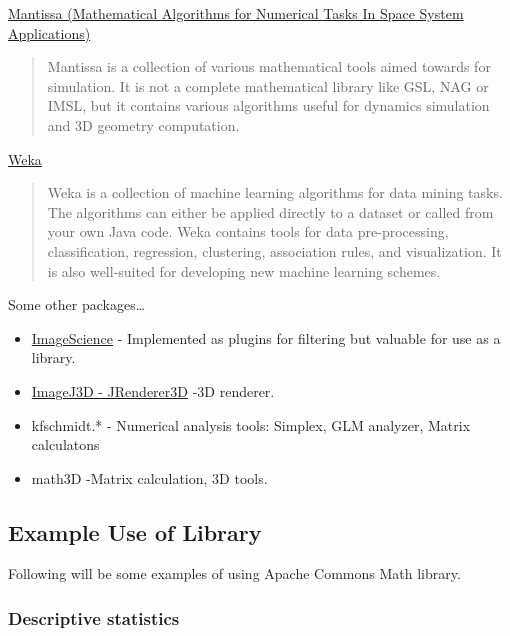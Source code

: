 \documentclass[11pt,a4paper,oneside]{report}
\begin{document}
\href{http://spaceroots.org/software/mantissa/index.html}{Mantissa (Mathematical Algorithms for Numerical Tasks In Space System Applications)}
\begin{shaded}
\begin{quote}
Mantissa is a collection of various mathematical tools aimed towards for simulation. It is not a complete mathematical library like GSL, NAG or IMSL, but it contains various algorithms useful for dynamics simulation and 3D geometry computation.
\end{quote}
\end{shaded}

\href{http://www.cs.waikato.ac.nz/ml/weka/}{Weka}
\begin{shaded}
\begin{quote}
Weka is a collection of machine learning algorithms for data mining tasks. The algorithms can either be applied directly to a dataset or called from your own Java code. Weka contains tools for data pre-processing, classification, regression, clustering, association rules, and visualization. It is also well-suited for developing new machine learning schemes.
\end{quote}
\end{shaded}

Some other packages\dots

\begin{itemize}
\item \href{http://www.imagescience.org/meijering/software/}{ImageScience} - Implemented as plugins for filtering but valuable for use as a library. 
\item \href{http://www.f4.htw-berlin.de/~barthel/ImageJ/ImageJ3D/ImageJ3D.html}{ImageJ3D - JRenderer3D} -3D renderer. 
\item kfschmidt.*  - Numerical analysis tools: Simplex, GLM analyzer, Matrix calculatons
\item math3D -Matrix calculation, 3D tools.  
\end{itemize}

\subsection{Example Use of Library}
Following will be some examples of using Apache Commons Math library. 
\subsubsection{Descriptive statistics}


\end{document}
